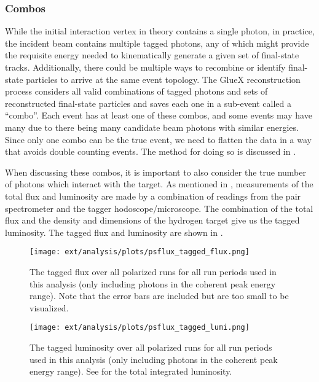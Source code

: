 \subsubsection{Combos}\label{subsub:combos}

While the initial interaction vertex in theory contains a single photon, in practice, the incident beam contains multiple tagged photons, any of which might provide the requisite energy needed to kinematically generate a given set of final-state tracks. Additionally, there could be multiple ways to recombine or identify final-state particles to arrive at the same event topology. The GlueX reconstruction process considers all valid combinations of tagged photons and sets of reconstructed final-state particles and saves each one in a sub-event called a ``combo''. Each event has at least one of these combos, and some events may have many due to there being many candidate beam photons with similar energies. Since only one combo can be the true event, we need to flatten the data in a way that avoids double counting events. The method for doing so is discussed in .

When discussing these combos, it is important to also consider the true number of photons which interact with the target. As mentioned in , measurements of the total flux and luminosity are made by a combination of readings from the pair spectrometer and the tagger hodoscope/microscope. The combination of the total flux and the density and dimensions of the hydrogen target give us the tagged luminosity. The tagged flux and luminosity are shown in .

\begin{figure}
  \begin{center}
      \texttt{[image: ext/analysis/plots/psflux\_tagged\_flux.png]}
  \end{center}
  \caption{The tagged flux over all polarized runs for all run periods used in this analysis (only including photons in the coherent peak energy range). Note that the error bars are included but are too small to be visualized.}\label{fig:tagged-flux}
\end{figure}

\begin{figure}
  \begin{center}
      \texttt{[image: ext/analysis/plots/psflux\_tagged\_lumi.png]}
  \end{center}
  \caption{The tagged luminosity over all polarized runs for all run periods used in this analysis (only including photons in the coherent peak energy range). See  for the total integrated luminosity.}\label{fig:tagged-luminosity}
\end{figure}

